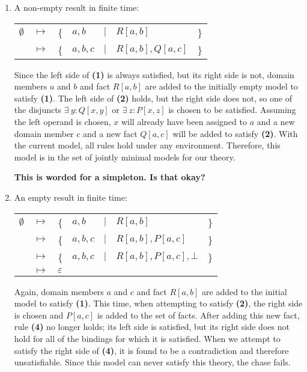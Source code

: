 		\begin{enumerate}
		\item A non-empty result in finite time:

			\begin{tabular}{lllllll}
				$\emptyset$ & $\mapsto$ & \{ & $a,b$   & $|$ & $R[a,b]$         & \} \\
				{}          & $\mapsto$ & \{ & $a,b,c$ & $|$ & $R[a,b], Q[a,c]$ & \} \\
			\end{tabular}

			Since the left side of \textbf{(1)} is always satisfied, but its
			right side is not, domain members $a$ and $b$ and fact $R[a,b]$
			are added to the initially empty model to satisfy \textbf{(1)}. The
			left side of \textbf{(2)} holds, but the right side does not, so
			one of the disjuncts $\exists\ y : Q[x,y]$ or $\exists\ z: P[x,z]$
			is chosen to be satisfied. Assuming the left operand is chosen, $x$
			will already have been assigned to $a$ and a new domain member $c$
			and a new fact $Q[a,c]$ will be added to satisfy \textbf{(2)}. With
			the current model, all rules hold under any environment. Therefore,
			this model is in the set of jointly minimal models for our theory.

			\textbf{This is worded for a simpleton. Is that okay?}

		\item An empty result in finite time:

			\begin{tabular}{lllllll}
				$\emptyset$ & $\mapsto$ & \{ & $a,b$   & $|$ & $R[a,b]$               & \} \\
				{}          & $\mapsto$ & \{ & $a,b,c$ & $|$ & $R[a,b], P[a,c]$       & \} \\
				{}          & $\mapsto$ & \{ & $a,b,c$ & $|$ & $R[a,b], P[a,c], \bot$ & \} \\
				{}          & $\mapsto$ & \multicolumn{5}{l}{ $\varepsilon$ } \\
			\end{tabular}

			Again, domain members $a$ and $c$ and fact $R[a,b]$ are added to
			the initial model to satisfy \textbf{(1)}.  This time, when
			attempting to satisfy \textbf{(2)}, the right side is chosen and
			$P[a,c]$ is added to the set of facts. After adding this new fact,
			rule \textbf{(4)} no longer holds; its left side is satisfied, but
			its right side does not hold for all of the bindings for which it
			is satisfied. When we attempt to satisfy the right side of
			\textbf{(4)}, it is found to be a contradiction and therefore
			unsatisfiable. Since this model can never satisfy this theory, the
			chase fails.


\end{enumerate}
